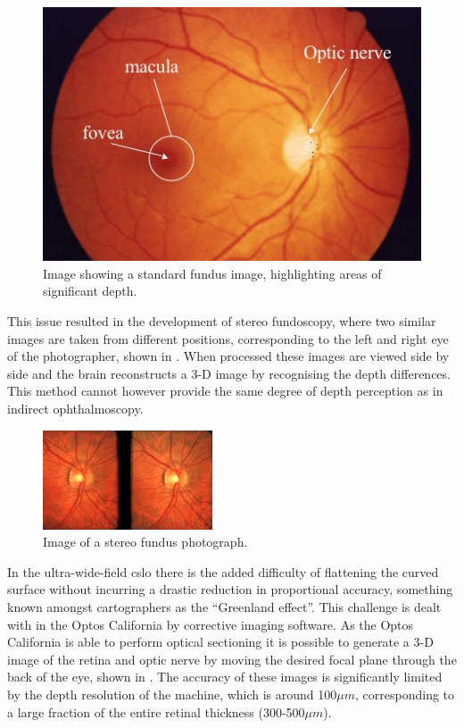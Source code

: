 \begin{figure}[H]
\centering
\includegraphics{figures/normalfundus}
\caption{Image showing a standard fundus image, highlighting areas of significant depth.\cite{saine2002ophthalmic}}
\label{fig:standard}
   \end{figure}

This issue resulted in the development of stereo fundoscopy, where
two similar images are taken from different positions, corresponding
to the left and right eye of the photographer, shown in .
When processed these images are viewed side by side and the brain
reconstructs a 3-D image by recognising the depth differences.\cite{tyler1997stereo}
This method cannot however provide the same degree of depth perception
as in indirect ophthalmoscopy.

\begin{figure}[H]
\centering
\includegraphics{figures/stereo}
\caption{Image of a stereo fundus photograph.\cite{tyler1997stereo}}
\label{fig:stereo}
   \end{figure}


In the ultra-wide-field \gls{cslo} there is the added difficulty of flattening
the curved surface without incurring a drastic reduction in proportional
accuracy, something known amongst cartographers as the \enquote{Greenland effect}.
This challenge is dealt with in the Optos California by corrective imaging
software. As the Optos California is able to perform optical sectioning it
is possible to generate a 3-D image of the retina and optic nerve by moving
the desired focal plane through the back of the eye, shown in .
The accuracy of these images is significantly limited by the depth resolution
of the machine, which is around 100$\mu m$, corresponding to  a large
fraction of the entire retinal thickness (300-500$\mu m$).


